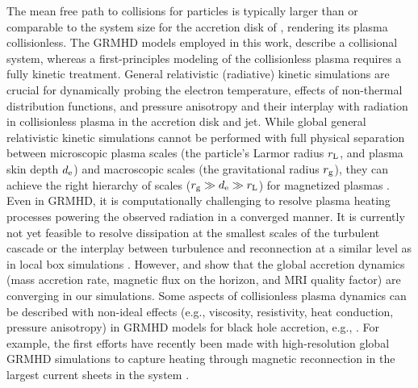 {The mean free path to collisions for particles is typically larger than or comparable to the system size for the accretion disk of \sgra, rendering its plasma collisionless. The GRMHD models employed in this work, describe a collisional system, whereas a first-principles modeling of the collisionless plasma requires a fully kinetic treatment. General relativistic (radiative) kinetic simulations are crucial for dynamically probing the electron temperature, effects of non-thermal distribution functions, and pressure anisotropy and their interplay with radiation in collisionless plasma in the accretion disk and jet. While global general relativistic kinetic simulations cannot be performed with full physical separation between microscopic plasma scales (the particle's Larmor radius $r_{\rm L}$, and plasma skin depth $d_{\rm e}$) and macroscopic scales (the gravitational radius $r_{\rm g}$), they can achieve the right hierarchy of scales ($r_{\rm g} \gg d_{\rm e} \gg r_{\rm L}$) for magnetized plasmas \citep{2018A&A...616A.184L,2018ApJ...863L..31C,2019PhRvL.122c5101P,2020PhRvL.124n5101C,2020ApJ...895..121C,2020ApJ...902...80K,2021A&A...650A.163C,2021PhRvL.127e5101B}. Even in GRMHD, it is computationally challenging to resolve plasma heating processes powering the observed radiation in a converged manner. It is currently not yet feasible to resolve dissipation at the smallest scales of the turbulent cascade or the interplay between turbulence and reconnection at a similar level as in local box simulations \citep{2012ApJ...755...50R,2013ApJ...773..118H,2015PhRvL.114f1101H,2016PhRvL.117w5101K,2017PhRvL.118e5103Z,2018PhRvL.121y5101C,2018ApJ...859..149I,2019PhRvL.122e5101Z,2021ApJ...921...87N,2021arXiv211108188C}. However, \citet{2019ApJS..243...26P} and \citet[in prep.]{Olivares_et_al} show that the global accretion dynamics (mass accretion rate, magnetic flux on the horizon, and MRI quality factor) are converging in our simulations. Some aspects of collisionless plasma dynamics can be described with non-ideal effects (e.g., viscosity, resistivity, heat conduction, pressure anisotropy) in GRMHD models for black hole accretion, e.g.,  \cite{2014MNRAS.440L..41B,2015ApJ...810..162C,2016MNRAS.456.1332F,2017ApJ...837...92C,2017MNRAS.470.2240F,2018ApJ...859...28Q,2019ApJS..244...10R,2019ApJ...882....2V,2020ApJ...900..100R,2021PhRvD.104j3028M,2021arXiv211103689N,2021arXiv211105752M}. For example, the first efforts have recently been made with high-resolution global GRMHD simulations to capture heating through magnetic reconnection in the largest current sheets in the system \citep{2020MNRAS.495.1549N,2020ApJ...900..100R,2021MNRAS.508.1241C,2021arXiv210915115R,2021arXiv211103689N}.}

